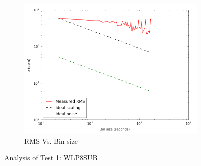 \documentclass{aastex6}
\begin{document}
\begin{figure}[H]
    \begin{subfigure}{3}
        \includegraphics[scale=0.6]{rms_test1}
        \caption{RMS Vs. Bin size}
    \end{subfigure}
    \caption{Analysis of Test 1: WLP8SUB}
\end{figure}
\end{document}
